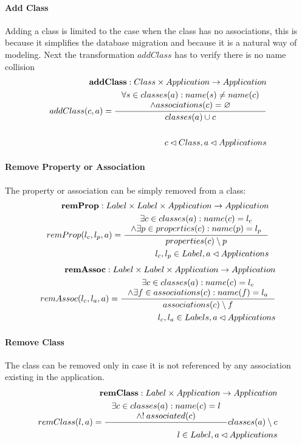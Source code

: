 \documentclass[11pt]{article}
\begin{document}
\paragraph{Add Class} Adding a class is limited to the case when the class has no associations, this is because it simplifies the database migration and because it is a natural way of modeling. Next the transformation $addClass$ has to verify there is no name collision
\begin{align*}
	\mathbf{addClass} : Class \times Application \rightarrow Application \\ 
	addClass(c, a) = \inference{\forall s \in classes(a) : name(s) \neq name(c) \\ \wedge associations(c) = \varnothing }{classes(a) \cup c} \\ \\
	c \lhd Class, a \lhd Applications
\end{align*}

\paragraph{Remove Property or Association} The property or association can be simply removed from a class:
\begin{align*}
 	\mathbf{remProp} : Label \times Label \times Application \rightarrow Application \\
 	remProp(l_c, l_p, a) = \inference{\exists c \in classes(a) : name(c) = l_c \\ \wedge \exists p \in properties(c) : name(p) = l_p
	}{properties(c) \setminus p }\\
	l_c, l_p \in Label, a \lhd Applications 
\end{align*}
\begin{align*}
	\mathbf{remAssoc} : Label \times Label \times Application \rightarrow Application \\
	remAssoc(l_c, l_a, a) = \inference{\exists c \in classes(a) : name(c) = l_c \\ \wedge \exists f \in associations(c) : name(f) = l_a }{associations(c) \setminus f} \\
	l_c, l_a \in Labels, a \lhd Applications
\end{align*}

\paragraph{Remove Class} The class can be removed only in case it is not referenced by any association existing in the application.
\begin{align*}
	\mathbf{remClass} : Label \times Application \rightarrow Application \\
	remClass(l, a) = \inference{\exists c \in classes(a) : name(c) = l \\ \wedge !\: associated(c)
	} {classes(a) \setminus c }\\
	l \in Label,a \lhd Applications
\end{align*}
\end{document}
